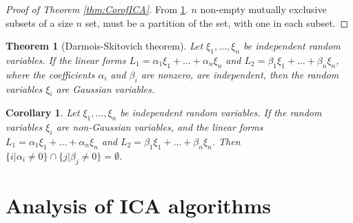 \documentclass[english]{article} %
\newtheorem{thm}[lemma]{Theorem}
\newtheorem{cor}[lemma]{Corollary}
\theoremstyle{definition}
\begin{document}
\begin{proof}[Proof of Theorem \ref{thm:CorofICA}]
From \cref{cor:DSTheoremCor}. $n$ non-empty mutually exclusive subsets of a size $n$ set, must be a partition of the set, with one in each subset.
\end{proof}
\begin{thm}[Darmois-Skitovich theorem]
Let $\xi_1,\ldots,\xi_n$ be independent random variables. If the linear forms $L_1 = \alpha_1\xi_1 + \ldots + \alpha_n\xi_n$ and $L_2 = \beta_1\xi_1 +\ldots + \beta_n\xi_n$, where the coefficients $\alpha_i$ and $\beta_i$ are nonzero, are independent, then the random variables $\xi_i$ are Gaussian variables.
\end{thm}

\begin{cor}
\label{cor:DSTheoremCor}
Let $\xi_1,\ldots,\xi_n$ be independent random variables. If the random variables $\xi_i$ are non-Gaussian variables, and the linear forms $L_1 = \alpha_1\xi_1 + \ldots + \alpha_n\xi_n$ and $L_2 = \beta_1\xi_1 +\ldots + \beta_n\xi_n$.  Then $\{i\vert \alpha_i \neq0\} \cap \{j\vert \beta_j \neq0\} = \emptyset$.
\end{cor}


\section{Analysis of ICA algorithms}
\end{document}
